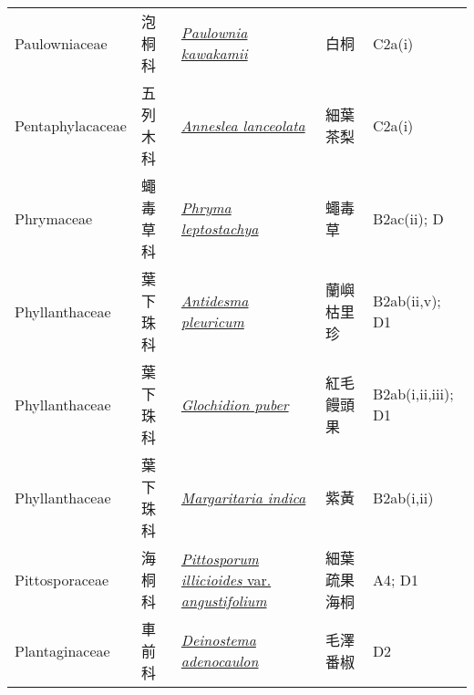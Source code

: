 {\begin{longtable}{L{2.5cm}L{2cm}L{5cm}L{2.5cm}L{3cm}}
    Paulowniaceae & 泡桐科 & \href{http://www.theplantlist.org/tpl1.1/search?q=Paulownia+kawakamii}{\textit{Paulownia kawakamii} } & 白桐 & C2a(i)    \\
    Pentaphylacaceae & 五列木科 & \href{http://www.theplantlist.org/tpl1.1/search?q=Anneslea+lanceolata}{\textit{Anneslea lanceolata} } & 細葉茶梨 & C2a(i)    \\
    Phrymaceae & 蠅毒草科 & \href{http://www.theplantlist.org/tpl1.1/search?q=Phryma+leptostachya}{\textit{Phryma leptostachya} } & 蠅毒草 & B2ac(ii); D    \\
    Phyllanthaceae & 葉下珠科 & \href{http://www.theplantlist.org/tpl1.1/search?q=Antidesma+pleuricum}{\textit{Antidesma pleuricum} } & 蘭嶼枯里珍 & B2ab(ii,v); D1    \\
    Phyllanthaceae & 葉下珠科 & \href{http://www.theplantlist.org/tpl1.1/search?q=Glochidion+puber}{\textit{Glochidion puber} } & 紅毛饅頭果 & B2ab(i,ii,iii); D1    \\
    Phyllanthaceae & 葉下珠科 & \href{http://www.theplantlist.org/tpl1.1/search?q=Margaritaria+indica}{\textit{Margaritaria indica} } & 紫黃 & B2ab(i,ii)    \\
    Pittosporaceae & 海桐科 & \href{http://www.theplantlist.org/tpl1.1/search?q=Pittosporum+illicioides+var.+angustifolium}{\textit{Pittosporum illicioides} var. \textit{angustifolium} } & 細葉疏果海桐 & A4; D1    \\
    Plantaginaceae & 車前科 & \href{http://www.theplantlist.org/tpl1.1/search?q=Deinostema+adenocaulon}{\textit{Deinostema adenocaulon} } & 毛澤番椒 & D2    \\

\end{longtable}}
